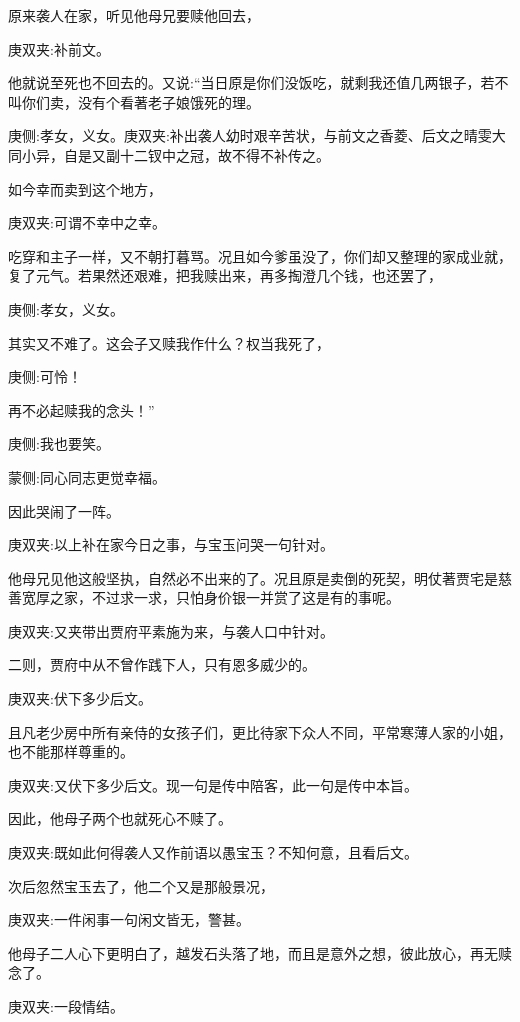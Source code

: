 \begin{parag}
    原来袭人在家，听见他母兄要赎他回去，\begin{note}庚双夹:补前文。\end{note}他就说至死也不回去的。又说:“当日原是你们没饭吃，就剩我还值几两银子，若不叫你们卖，没有个看著老子娘饿死的理。\begin{note}庚侧:孝女，义女。庚双夹:补出袭人幼时艰辛苦状，与前文之香菱、后文之晴雯大同小异，自是又副十二钗中之冠，故不得不补传之。\end{note}如今幸而卖到这个地方，\begin{note}庚双夹:可谓不幸中之幸。\end{note}吃穿和主子一样，又不朝打暮骂。况且如今爹虽没了，你们却又整理的家成业就，复了元气。若果然还艰难，把我赎出来，再多掏澄几个钱，也还罢了，\begin{note}庚侧:孝女，义女。\end{note}其实又不难了。这会子又赎我作什么？权当我死了，\begin{note}庚侧:可怜！\end{note}再不必起赎我的念头！”\begin{note}庚侧:我也要笑。\end{note}\begin{note}蒙侧:同心同志更觉幸福。\end{note}因此哭闹了一阵。\begin{note}庚双夹:以上补在家今日之事，与宝玉问哭一句针对。\end{note}
\end{parag}


\begin{parag}
    他母兄见他这般坚执，自然必不出来的了。况且原是卖倒的死契，明仗著贾宅是慈善宽厚之家，不过求一求，只怕身价银一并赏了这是有的事呢。\begin{note}庚双夹:又夹带出贾府平素施为来，与袭人口中针对。\end{note}二则，贾府中从不曾作践下人，只有恩多威少的。\begin{note}庚双夹:伏下多少后文。\end{note}且凡老少房中所有亲侍的女孩子们，更比待家下众人不同，平常寒薄人家的小姐，也不能那样尊重的。\begin{note}庚双夹:又伏下多少后文。现一句是传中陪客，此一句是传中本旨。\end{note}因此，他母子两个也就死心不赎了。\begin{note}庚双夹:既如此何得袭人又作前语以愚宝玉？不知何意，且看后文。\end{note}次后忽然宝玉去了，他二个又是那般景况，\begin{note}庚双夹:一件闲事一句闲文皆无，警甚。\end{note}他母子二人心下更明白了，越发石头落了地，而且是意外之想，彼此放心，再无赎念了。\begin{note}庚双夹:一段情结。\end{note}
\end{parag}


